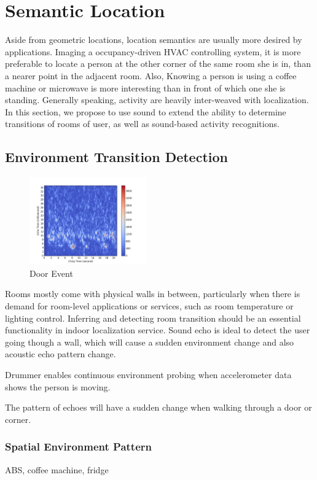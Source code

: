 \section{Semantic Location}
\label{sec:sem}

Aside from geometric locations, location semantics are usually more desired by applications.
Imaging a occupancy-driven HVAC controlling system, it is more preferable to locate a person 
at the other corner of the same room she is in, than a nearer point in the adjacent room. Also,
Knowing a person is using a coffee machine or microwave is more interesting than in front of which 
one she is standing. Generally speaking, activity are heavily inter-weaved with localization.
In this section, we propose to use sound to extend the ability to determine transitions of rooms 
of user, as well as sound-based activity recognitions.


\subsection{Environment Transition Detection}
\begin{figure}[H]
\centering
\includegraphics[width=0.45\textwidth]{./fig/transition.png}
\caption{Door Event}
\end{figure}


Rooms mostly come with physical walls in between, particularly when there is demand for 
room-level applications or services, such as room temperature or lighting control. Inferring and 
detecting room transition should be an essential functionality in indoor localization service.
Sound echo is ideal to detect the user going though a wall, which will cause a sudden environment 
change and also acoustic echo pattern change.


Drummer enables continuous environment probing when accelerometer data shows the person is moving.
 


The pattern of 
echoes will have a sudden change when walking through a door or corner.



\subsubsection{Spatial Environment Pattern}

ABS, coffee machine, fridge 
